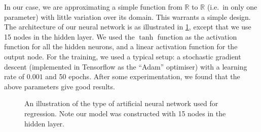 \documentclass[11pt]{article}
\begin{document}
In our case, we are approximating a simple function from $\mathbb{R}$ to $\mathbb{R}$ (i.e.\ in only one parameter) with little variation over its domain.
This warrants a simple design.
The architecture of our neural network is as illustrated in \cref{fig:ANN}, except that we use 15 nodes in the hidden layer.
We used the $\tanh$ function as the activation function for all the hidden neurons, and a linear activation function for the output node.
For the training, we used a typical setup: a stochastic gradient descent (implemented in Tensorflow as the ``Adam'' optimiser) with a learning rate of $0.001$ and 50 epochs.
After some experimentation, we found that the above parameters give good results.

\begin{figure}
  \centering
  \caption{An illustration of the type of artificial neural network used for regression. Note our model was constructed with 15 nodes in the hidden layer.}
  \label{fig:ANN}
\end{figure}
\end{document}
